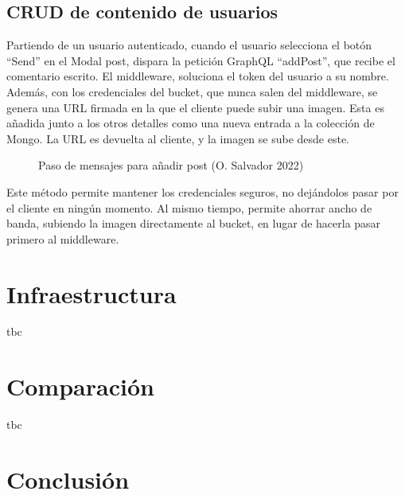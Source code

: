 \documentclass[11pt]{article}
\begin{document}
\begin{flushleft}
		
	\subsection{CRUD de contenido de usuarios}
		Partiendo de un usuario autenticado, cuando el usuario selecciona el botón “Send” en el Modal post, dispara la petición GraphQL “addPost”, que recibe el comentario escrito. El middleware, soluciona el token del usuario a su nombre. Además, con los credenciales del bucket, que nunca salen del middleware, se genera una URL firmada en la que el cliente puede subir una imagen. Esta es añadida junto a los otros detalles como una nueva entrada a la colección de Mongo. La URL es devuelta al cliente, y la imagen se sube desde este. 
		\linebreak
		
			\begin{figure}[htb]
				\centering
				\caption{Paso de mensajes para añadir post (O. Salvador 2022)}
			\end{figure}	
			
		Este método permite mantener los credenciales seguros, no dejándolos pasar por el cliente en ningún momento. Al mismo tiempo, permite ahorrar ancho de banda, subiendo la imagen directamente al bucket, en lugar de hacerla pasar primero al middleware. 
		\linebreak
		
\section{Infraestructura}
tbc

\section{Comparación}
tbc

\section{Conclusión}




\end{flushleft}
\end{document}
